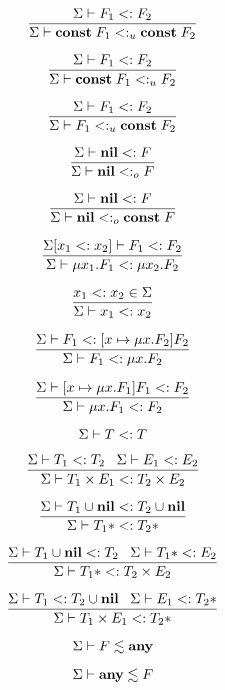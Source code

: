 \[
\dfrac{\Sigma \vdash F_{1} <: F_{2}}
      {\Sigma \vdash \mathbf{const} \; F_{1} <:_{u} \mathbf{const} \; F_{2}}
\]

\[
\dfrac{\Sigma \vdash F_{1} <: F_{2}}
      {\Sigma \vdash \mathbf{const} \; F_{1} <:_{u} F_{2}}
\]

\[
\dfrac{\Sigma \vdash F_{1} <: F_{2}}
      {\Sigma \vdash F_{1} <:_{u} \mathbf{const} \; F_{2}}
\]

\[
\dfrac{\Sigma \vdash \mathbf{nil} <: F}
      {\Sigma \vdash \mathbf{nil} <:_{o} F}
\]

\[
\dfrac{\Sigma \vdash \mathbf{nil} <: F}
      {\Sigma \vdash \mathbf{nil} <:_{o} \mathbf{const} \; F}
\]

\[
\dfrac{\Sigma[x_{1} <: x_{2}] \vdash F_{1} <: F_{2}}
      {\Sigma \vdash \mu x_{1}.F_{1} <: \mu x_{2}.F_{2}}
\]

\[
\dfrac{x_{1} <: x_{2} \in \Sigma}
      {\Sigma \vdash x_{1} <: x_{2}}
\]

\[
\dfrac{\Sigma \vdash F_{1} <: [x \mapsto \mu x.F_{2}]F_{2}}
      {\Sigma \vdash F_{1} <: \mu x.F_{2}}
\]

\[
\dfrac{\Sigma \vdash [x \mapsto \mu x.F_{1}]F_{1} <: F_{2}}
      {\Sigma \vdash \mu x.F_{1} <: F_{2}}
\]

\[
\Sigma \vdash T <: T
\]

\[
\dfrac{\Sigma \vdash T_{1} <: T_{2} \;\;\;
       \Sigma \vdash E_{1} <: E_{2}}
      {\Sigma \vdash T_{1} \times E_{1} <: T_{2} \times E_{2}}
\]

\[
\dfrac{\Sigma \vdash T_{1} \cup \mathbf{nil} <: T_{2} \cup \mathbf{nil}}
      {\Sigma \vdash T_{1}{*} <: T_{2}{*}}
\]

\[
\dfrac{\Sigma \vdash T_{1} \cup \mathbf{nil} <: T_{2} \;\;\;
       \Sigma \vdash T_{1}{*} <: E_{2}}
      {\Sigma \vdash T_{1}{*} <: T_{2} \times E_{2}}
\]

\[
\dfrac{\Sigma \vdash T_{1} <: T_{2} \cup \mathbf{nil} \;\;\;
       \Sigma \vdash E_{1} <: T_{2}{*}}
      {\Sigma \vdash T_{1} \times E_{1} <: T_{2}{*}}
\]

\[
\Sigma \vdash F \lesssim \mathbf{any}
\]

\[
\Sigma \vdash \mathbf{any} \lesssim F
\]

